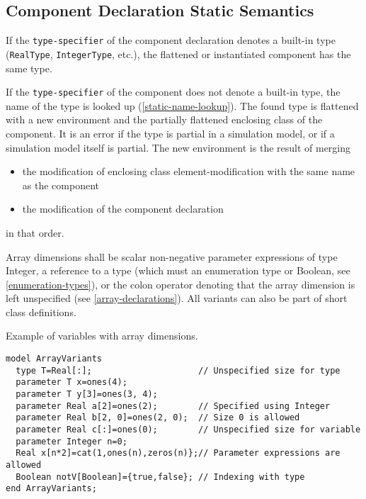 \subsection{Component Declaration Static Semantics}\label{component-declaration-static-semantics}

If the \lstinline!type-specifier! of the component declaration denotes a built-in
type (\lstinline!RealType!, \lstinline!IntegerType!, etc.), the flattened or instantiated
component has the same type.

If the \lstinline!type-specifier! of the component does not denote a built-in type,
the name of the type is looked up (\cref{static-name-lookup}). The found type is
flattened with a new environment and the partially flattened enclosing
class of the component. It is an error if the type is partial in a
simulation model, or if a simulation model itself is partial. The new
environment is the result of merging

\begin{itemize}
\item
  the modification of enclosing class element-modification with the same
  name as the component
\item
  the modification of the component declaration
\end{itemize}
in that order.

Array dimensions shall be scalar non-negative parameter expressions of type Integer,
a reference to a type (which must an enumeration type or Boolean, see \cref{enumeration-types}),
or the colon operator denoting that the array dimension is left unspecified (see \cref{array-declarations}).
All variants can also be part of short class definitions.

\begin{nonnormative}
Example of variables with array dimensions.
\begin{lstlisting}[language=modelica]
model ArrayVariants
  type T=Real[:];                     // Unspecified size for type
  parameter T x=ones(4);
  parameter T y[3]=ones(3, 4);
  parameter Real a[2]=ones(2);        // Specified using Integer
  parameter Real b[2, 0]=ones(2, 0);  // Size 0 is allowed
  parameter Real c[:]=ones(0);        // Unspecified size for variable
  parameter Integer n=0;
  Real x[n*2]=cat(1,ones(n),zeros(n)};// Parameter expressions are allowed
  Boolean notV[Boolean]={true,false}; // Indexing with type
end ArrayVariants;
\end{lstlisting}
\end{nonnormative}

